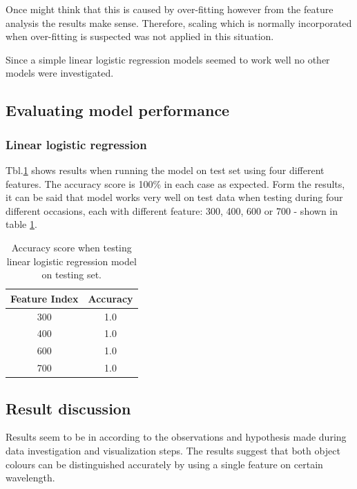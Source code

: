 \documentclass[11pt]{article}
\begin{document}
				Once might think that this is caused by over-fitting however from the feature analysis the results make sense. Therefore, scaling which is normally incorporated when over-fitting is suspected was not applied in this situation. 

				Since a simple linear logistic regression models seemed to work well no other models were investigated.

		\subsection{Evaluating model performance}
			\subsubsection{Linear logistic regression}
				Tbl.\ref{tbl:binary_test_table} shows results when running the model on test set using four different features. The accuracy score is 100\% in each case as expected. Form the results, it can be said that model works very well on test data when testing during four different occasions, each with different feature: 300, 400, 600 or 700 - shown in table \ref{tbl:binary_test_table}.
			
			\begin{center}
			  	\begin{table}[h]
			  	\centering
				\begin{tabular}[b]{|c | c|}
					 \hline
					 Feature Index 	 & Accuracy \\ 
	 				 \hline
					 300 				& 1.0 	\\ 
					 400 				& 1.0 	\\ 
					 600		 		& 1.0 	\\ 
					 700				& 1.0 	\\ 
					 \hline
				\end{tabular}
				\caption{Accuracy score when testing linear logistic regression model on testing set.}
				\label{tbl:binary_test_table}
				\end{table}
			\end{center}
			\vspace*{-1.5cm}

		\subsection{Result discussion}
			Results seem to be in according to the observations and hypothesis made during data investigation and visualization steps. The results suggest that both object colours can be distinguished accurately by using a single feature on certain wavelength.
\end{document}
